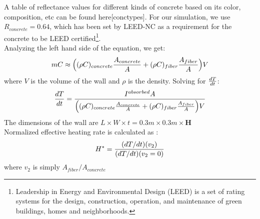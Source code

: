 \documentclass[times, 10pt,a4paper]{article}
\begin{document}
A table of reflectance values for different kinds of concrete based on its color, composition, etc can be found here[conctypes]. For our simulation, we
use $R_{concrete} = 0.64$, which has been set by LEED-NC as a requirement for the concrete to be LEED certified\footnote[3]
{Leadership in Energy and Environmental Design (LEED) is a set of rating systems for the design, construction, operation, and maintenance of green buildings, 
homes and neighborhoods.}.\\
Analyzing the left hand side of the equation, we get:\\
\begin{equation}
mC \approx \Big{(}(\rho C)_{concrete}{A_{concrete} \over A} + (\rho C)_{fiber}{A_{fiber} \over A}\Big{)}V
\end{equation}
where $V$ is the volume of the wall and $\rho$ is the density. Solving for ${dT \over dt}$:
\begin{equation}
{dT \over dt} = {I^{absorbed}A \over {\Big{(}(\rho C)_{concrete}{A_{concrete} \over A} + (\rho C)_{fiber}{A_{fiber} \over A}\Big{)}}V}
\end{equation}
The dimensions of the wall are $L\times W\times t = 0.3m\times 0.3m \times \textbf{H}$\\
Normalized effective heating rate is calculated as :
\begin{equation}
H^* = {(dT/dt)(v_2) \over (dT/dt)(v_2 = 0)}
\end{equation}
where $v_2$ is simply $A_{fiber}/A_{concrete}$
%
\end{document}
